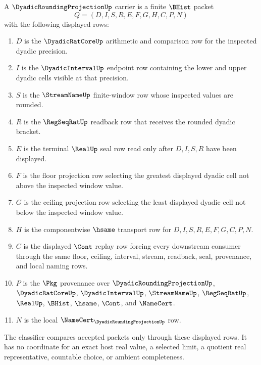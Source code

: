 \begin{definition}
\label{def:dyadic-rounding-projection-carrier}
A $\DyadicRoundingProjectionUp$ carrier is a finite $\BHist$ packet
$$
Q=(D,I,S,R,E,F,G,H,C,P,N)
$$
with the following displayed rows:
\begin{enumerate}
\item $D$ is the $\DyadicRatCoreUp$ arithmetic and comparison row for the inspected dyadic precision.
\item $I$ is the $\DyadicIntervalUp$ endpoint row containing the lower and upper dyadic cells visible at that precision.
\item $S$ is the $\StreamNameUp$ finite-window row whose inspected values are rounded.
\item $R$ is the $\RegSeqRatUp$ readback row that receives the rounded dyadic bracket.
\item $E$ is the terminal $\RealUp$ seal row read only after $D,I,S,R$ have been displayed.
\item $F$ is the floor projection row selecting the greatest displayed dyadic cell not above the inspected window value.
\item $G$ is the ceiling projection row selecting the least displayed dyadic cell not below the inspected window value.
\item $H$ is the componentwise $\hsame$ transport row for $D,I,S,R,E,F,G,C,P,N$.
\item $C$ is the displayed $\Cont$ replay row forcing every downstream consumer through the same floor, ceiling, interval, stream, readback, seal, provenance, and local naming rows.
\item $P$ is the $\Pkg$ provenance over $\DyadicRoundingProjectionUp$, $\DyadicRatCoreUp$, $\DyadicIntervalUp$, $\StreamNameUp$, $\RegSeqRatUp$, $\RealUp$, $\BHist$, $\hsame$, $\Cont$, and $\NameCert$.
\item $N$ is the local $\NameCert_{\DyadicRoundingProjectionUp}$ row.
\end{enumerate}
The classifier compares accepted packets only through these displayed rows. It has no coordinate for an exact host real value, a selected limit, a quotient real representative, countable choice, or ambient completeness.
\end{definition}


